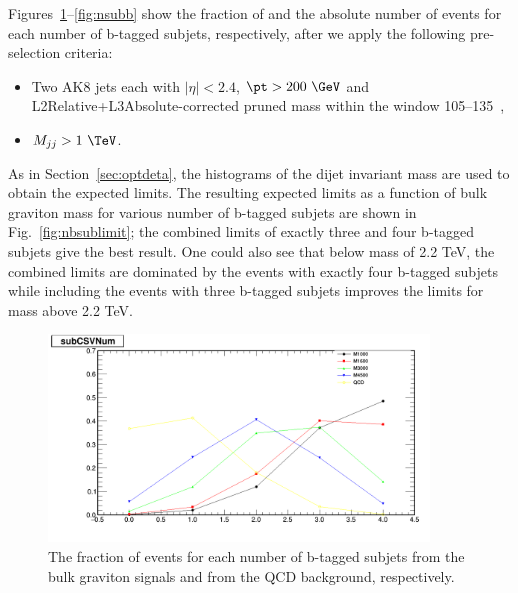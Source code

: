 Figures~\ref{fig:fracsubb}--\ref{fig:nsubb} show the fraction of and the 
absolute number of events for each number of b-tagged subjets, respectively, 
after we apply the following pre-selection criteria: 
\begin{itemize}
\item Two AK8 jets each with $|\eta|<2.4$, $\pt>200~\GeV$ and
L2Relative+L3Absolute-corrected pruned mass within the window 105--135~\GeV,
\item $M_{jj} > 1~\TeV$.
\end{itemize}
As in Section~\ref{sec:optdeta}, the histograms of the dijet invariant mass 
are used to obtain the expected limits.  
The resulting expected limits as a function of bulk graviton mass for 
various number of b-tagged subjets are shown in Fig.~\ref{fig:nbsublimit}; 
the combined limits of exactly three and four b-tagged subjets give the best 
result. One could also see that below mass of 2.2 TeV, the combined limits 
are dominated by the events with exactly four b-tagged subjets while 
including the events with three b-tagged subjets improves the limits for mass 
above 2.2 TeV.




\begin{figure}[htbp]
   \centering
   \includegraphics[width=0.9\textwidth]{figures/optimization/numberSubjetBtag/CSVNum.png}
   \caption{The fraction of events for each number of b-tagged 
   subjets from the bulk graviton signals and from the QCD background, 
   respectively.}
   \label{fig:fracsubb}
\end{figure}

